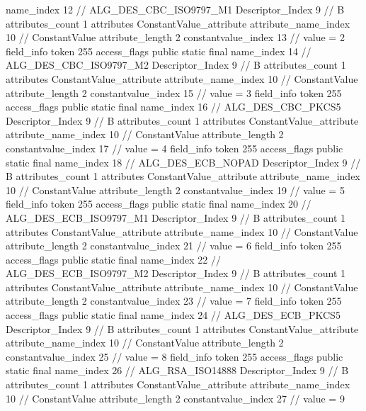 {{{{{				name_index	12		// ALG_DES_CBC_ISO9797_M1
				Descriptor_Index	9		// B
				attributes_count	1
				attributes {
				ConstantValue_attribute {
					attribute_name_index	10		// ConstantValue
					attribute_length	2
					constantvalue_index	13		// value = 2
				}
				}
			}
			field_info {
				token	255
				access_flags	public static final
				name_index	14		// ALG_DES_CBC_ISO9797_M2
				Descriptor_Index	9		// B
				attributes_count	1
				attributes {
				ConstantValue_attribute {
					attribute_name_index	10		// ConstantValue
					attribute_length	2
					constantvalue_index	15		// value = 3
				}
				}
			}
			field_info {
				token	255
				access_flags	public static final
				name_index	16		// ALG_DES_CBC_PKCS5
				Descriptor_Index	9		// B
				attributes_count	1
				attributes {
				ConstantValue_attribute {
					attribute_name_index	10		// ConstantValue
					attribute_length	2
					constantvalue_index	17		// value = 4
				}
				}
			}
			field_info {
				token	255
				access_flags	public static final
				name_index	18		// ALG_DES_ECB_NOPAD
				Descriptor_Index	9		// B
				attributes_count	1
				attributes {
				ConstantValue_attribute {
					attribute_name_index	10		// ConstantValue
					attribute_length	2
					constantvalue_index	19		// value = 5
				}
				}
			}
			field_info {
				token	255
				access_flags	public static final
				name_index	20		// ALG_DES_ECB_ISO9797_M1
				Descriptor_Index	9		// B
				attributes_count	1
				attributes {
				ConstantValue_attribute {
					attribute_name_index	10		// ConstantValue
					attribute_length	2
					constantvalue_index	21		// value = 6
				}
				}
			}
			field_info {
				token	255
				access_flags	public static final
				name_index	22		// ALG_DES_ECB_ISO9797_M2
				Descriptor_Index	9		// B
				attributes_count	1
				attributes {
				ConstantValue_attribute {
					attribute_name_index	10		// ConstantValue
					attribute_length	2
					constantvalue_index	23		// value = 7
				}
				}
			}
			field_info {
				token	255
				access_flags	public static final
				name_index	24		// ALG_DES_ECB_PKCS5
				Descriptor_Index	9		// B
				attributes_count	1
				attributes {
				ConstantValue_attribute {
					attribute_name_index	10		// ConstantValue
					attribute_length	2
					constantvalue_index	25		// value = 8
				}
				}
			}
			field_info {
				token	255
				access_flags	public static final
				name_index	26		// ALG_RSA_ISO14888
				Descriptor_Index	9		// B
				attributes_count	1
				attributes {
				ConstantValue_attribute {
					attribute_name_index	10		// ConstantValue
					attribute_length	2
					constantvalue_index	27		// value = 9
}}}}}}}
